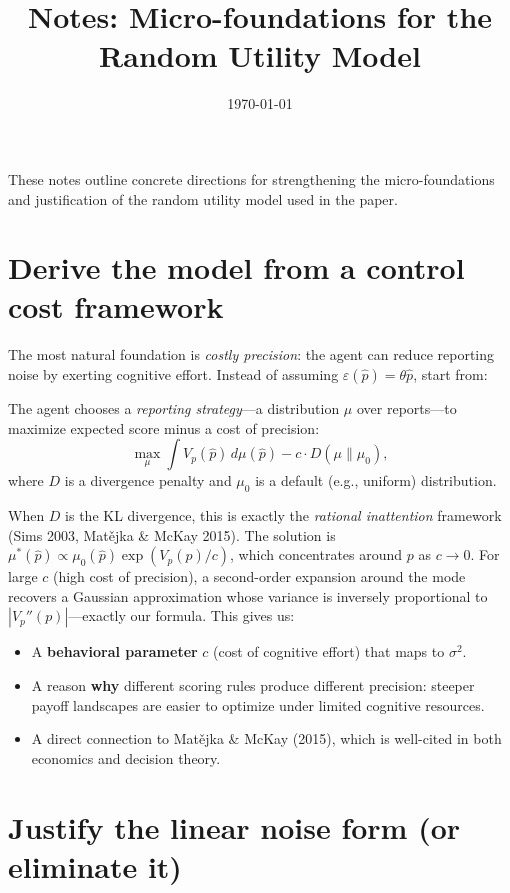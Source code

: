 \documentclass[11pt]{article}
\title{Notes: Micro-foundations for the Random Utility Model}
\author{}
\date{\today}
\begin{document}
\maketitle

These notes outline concrete directions for strengthening the micro-foundations and justification of the random utility model used in the paper.

\section{Derive the model from a control cost framework}

The most natural foundation is \emph{costly precision}: the agent can reduce reporting noise by exerting cognitive effort. Instead of assuming $\varepsilon(\hat{p}) = \theta\hat{p}$, start from:

The agent chooses a \emph{reporting strategy}---a distribution $\mu$ over reports---to maximize expected score minus a cost of precision:
\[
\max_{\mu} \int V_p(\hat{p})\, d\mu(\hat{p}) - c \cdot D(\mu \| \mu_0),
\]
where $D$ is a divergence penalty and $\mu_0$ is a default (e.g., uniform) distribution.

When $D$ is the KL divergence, this is exactly the \emph{rational inattention} framework (Sims 2003, Mat\v{e}jka \& McKay 2015). The solution is $\mu^*(\hat{p}) \propto \mu_0(\hat{p}) \exp(V_p(\hat{p})/c)$, which concentrates around $p$ as $c \to 0$. For large $c$ (high cost of precision), a second-order expansion around the mode recovers a Gaussian approximation whose variance is inversely proportional to $|V_p''(p)|$---exactly our formula. This gives us:
\begin{itemize}
\item A \textbf{behavioral parameter} $c$ (cost of cognitive effort) that maps to $\sigma^2$.
\item A reason \textbf{why} different scoring rules produce different precision: steeper payoff landscapes are easier to optimize under limited cognitive resources.
\item A direct connection to Mat\v{e}jka \& McKay (2015), which is well-cited in both economics and decision theory.
\end{itemize}

\section{Justify the linear noise form (or eliminate it)}
\end{document}
